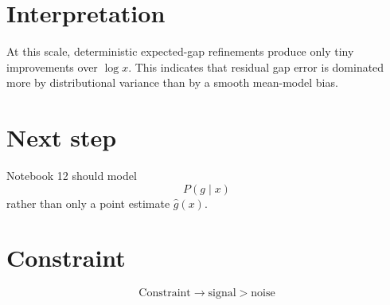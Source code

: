 \documentclass[11pt]{article}
\begin{document}
\section*{Interpretation}
At this scale, deterministic expected-gap refinements produce only tiny improvements over
$\log x$. This indicates that residual gap error is dominated more by distributional
variance than by a smooth mean-model bias.

\section*{Next step}
Notebook 12 should model
\[
  P(g\mid x)
\]
rather than only a point estimate $\hat g(x)$.

\section*{Constraint}
\[
\text{Constraint} \rightarrow \text{signal} > \text{noise}
\]
\end{document}
